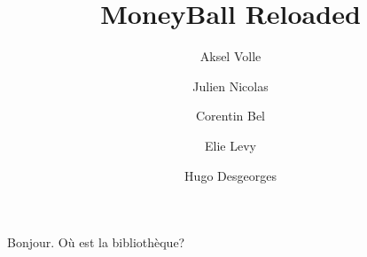 \documentclass[11pt, french]{report}
\title{MoneyBall Reloaded}
\author{Aksel Volle
    \affiliation{
	Gros batard
    }	
}
\author{Julien Nicolas
    \affiliation{
	Gros batard
    }	
}
\author{Corentin Bel
    \affiliation{
	Gros batard
    }	
}
\author{Elie Levy
    \affiliation{
	Gros batard
    }	
}
\author{Hugo Desgeorges
    \affiliation{
	Gros batard
    }	
}
\begin{document}
\maketitle   
Bonjour. Où est la bibliothèque?
\end{document}
